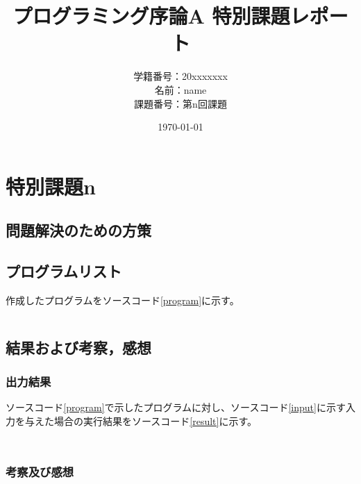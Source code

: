 \documentclass[a4paper]{ltjsarticle}
\title{プログラミング序論A 特別課題レポート}
\author{学籍番号：20xxxxxxx\\名前：name\\課題番号：第n回課題}
\date{\today}
\begin{document}
\maketitle

\section{特別課題n}

\subsection{問題解決のための方策}

\subsection{プログラムリスト}
作成したプログラムをソースコード\ref{program}に示す。
\begin{lstlisting}[caption=特別課題nのプログラム,label=program]

\end{lstlisting}
\subsection{結果および考察，感想}
\subsubsection{出力結果}
ソースコード\ref{program}で示したプログラムに対し、ソースコード\ref{input}に示す入力を与えた場合の実行結果をソースコード\ref{result}に示す。
\begin{lstlisting}[caption=特別課題nのプログラムに対する入力,label=input]

\end{lstlisting}
\begin{lstlisting}[caption=特別課題nのプログラムの実行結果,label=result]

\end{lstlisting}
\subsubsection{考察及び感想}
\end{document}

